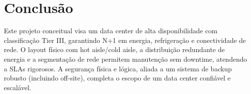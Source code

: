 \documentclass[
	12pt,				%
	oneside,			%
	a4paper,			%
	english,			%
	brazil				%
	]{abntex2unama}
\begin{document}
\chapter{Conclusão}
Este projeto conceitual visa um data center de alta disponibilidade com classificação Tier III, garantindo N+1 em energia, refrigeração e conectividade de rede. O layout físico com hot aisle/cold aisle, a distribuição redundante de energia e a segmentação de rede permitem manutenção sem downtime, atendendo a SLAs rigorosos. A segurança física e lógica, aliada a um sistema de backup robusto (incluindo off-site), completa o escopo de um data center confiável e escalável.

\postextual

% 

%
%

\end{document}
